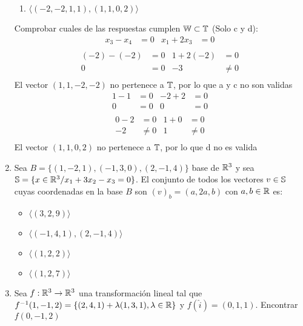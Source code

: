 \documentclass[../practica.root.tex]{subfiles}
\begin{document}
\begin{enumerate}
\begin{enumerate}
              \item $ \langle (−2,−2,1,1),(1,1,0,2) \rangle $ \xmark
          \end{enumerate}
          Comprobar cuales de las respuestas cumplen $ \W \subset \T $ (Solo c y d):
          \begin{align*}
              x_3 − x_4 & = 0 & x_1 + 2x_3 & = 0 \\
          \end{align*}
          \begin{align*}
              (-2) − (-2) & = 0 & 1 + 2(-2) & = 0    \\
              0           & = 0 & -3        & \neq 0 \\
          \end{align*}
          El vector $ (1,1,-2,-2) $ no pertenece a $ \T $, por lo que a y c no son validas
          \begin{align*}
              1 - 1 & = 0 & -2 + 2 & = 0 \\
              0     & = 0 & 0      & = 0 \\
          \end{align*}
          \begin{align*}
              0 - 2 & = 0    & 1 + 0 & = 0    \\
              -2    & \neq 0 & 1     & \neq 0 \\
          \end{align*}
          El vector $ (1,1,0,2) $ no pertenece a $ \T $, por lo que d no es valida
    \item Sea $ B = \{(1,-2,1),(-1,3,0),(2,-1,4) \}$ base de $ \R^3 $ y sea $ \S = \{ x \in \R^3 / x_1 + 3x_2 - x_3 = 0 \} $. El conjunto de todos los vectores $ v \in \S $ cuyas coordenadas en la base $B$ son $ (v)_b = (a,2a,b) $ con $ a,b \in \R $ es:
          \begin{itemize}
              \item $\langle (3,2,9) \rangle$
              \item $\langle (-1,4,1),(2,-1,4) \rangle$
              \item $\langle (1,2,2) \rangle$
              \item $\langle (1,2,7) \rangle$
          \end{itemize}
    \item Sea $ f : \R^3 \to \R^3 $ una transformación lineal tal que $ f^{-1}(1,-1,2) = \{ (2,4,1) + \lambda(1,3,1),\lambda \in \R \} $ y $ f(\hat{i}) = (0,1,1) $. Encontrar $ f(0,-1,2) $ \\ \\

\end{enumerate}
\end{document}
